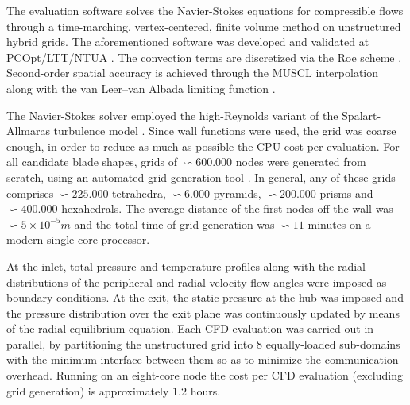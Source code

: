 The evaluation software solves the Navier-Stokes equations for compressible flows through a time-marching, vertex-centered, finite volume method on unstructured hybrid grids. The aforementioned software was developed and validated at PCOpt/LTT/NTUA \cite{phd_Vera,phd_Kampolis}. The convection terms are discretized via the Roe scheme \cite{Roe81}. Second-order spatial accuracy is achieved through the MUSCL interpolation \cite{vleer:muscl} along with the van Leer--van Albada limiting function \cite{valbada:82}. 

The Navier-Stokes solver employed the high-Reynolds variant of the Spalart-Allmaras turbulence model \cite{phd_Kampolis}. Since wall functions were used, the grid was coarse enough, in order to reduce as much as possible the CPU cost per evaluation. For all candidate blade shapes, grids of $\backsim \! 600.000$ nodes were generated from scratch, using an automated grid generation tool \cite{phd_Kampolis}. In general, any of these grids comprises $\backsim \! 225.000$ tetrahedra, $\backsim \! 6.000$ pyramids, $\backsim \! 200.000$ prisms and $\backsim \! 400.000$ hexahedrals. The average distance of the first nodes off the wall was $\backsim \! 5\times10^{-5}m$ and the total time of grid generation was $\backsim \! 11$ minutes on a modern single-core processor. 

At the inlet, total pressure and temperature profiles along with the radial distributions of the peripheral and radial velocity flow angles were imposed as boundary conditions. At the exit, the static pressure at the hub was imposed and the pressure distribution over the exit plane was continuously updated by means of the radial equilibrium equation. 
Each CFD evaluation was carried out in parallel, by partitioning the unstructured grid into $8$ equally-loaded sub-domains with the minimum interface between them so as to minimize the communication overhead. Running on an eight-core node the cost per CFD evaluation (excluding grid generation) is approximately $1.2$ hours. 





